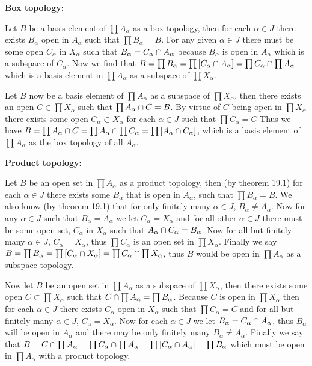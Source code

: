 \documentclass{article}
\begin{document}
\textbf{Box topology:}

Let $B$ be a basis element of $\prod A_\alpha$ as a box topology, then for each $\alpha \in J$ there exists $B_\alpha$ open in $A_\alpha$ such that $\prod B_\alpha = B$. For any given $\alpha\in J$ there must be some open $C_\alpha$ in $X_\alpha$ such that $B_\alpha = C_\alpha \cap A_\alpha$ because $B_\alpha$ is open in $A_\alpha$ which is a subspace of $C_\alpha$. Now we find that $B = \prod B_\alpha = \prod\left[C_\alpha \cap A_\alpha\right] = \prod C_\alpha \cap \prod A_\alpha$ which is a basis element in $\prod A_\alpha$ as a subspace of $\prod X_\alpha$.

Let $B$ now be a basis element of $\prod A_\alpha$ as a subspace of $\prod X_\alpha$, then there exists an open $C \in \prod X_\alpha$ such that $\prod A_\alpha \cap C = B$. By virtue of $C$ being open in $\prod X_\alpha$ there exists some open $C_\alpha \subset X_\alpha$ for each $\alpha \in J$ such that $\prod C_\alpha = C$ Thus we have $B = \prod A_\alpha \cap C = \prod A_\alpha \cap \prod C_\alpha = \prod\left[A_\alpha \cap C_\alpha\right]$, which is a basis element of $\prod A_\alpha$ as the box topology of all $A_\alpha$.

\textbf{Product topology:}

Let $B$ be an open set in $\prod A_\alpha$ as a product topology, then (by theorem 19.1) for each $\alpha \in J$ there exists some $B_\alpha$ that is open in $A_\alpha$, such that $\prod B_\alpha = B$. We also know (by theorem 19.1) that for only finitely many $\alpha \in J$, $B_\alpha \not= A_\alpha$. Now for any $\alpha \in J$ such that $B_\alpha = A_\alpha$ we let $C_\alpha = X_\alpha$ and for all other $\alpha \in J$ there must be some open set, $C_\alpha$ in $X_\alpha$ such that $A_\alpha \cap C_\alpha = B_\alpha$. Now for all but finitely many $\alpha \in J$, $C_\alpha = X_\alpha$, thus $\prod C_\alpha$ is an open set in $\prod X_\alpha$. Finally we say $B = \prod B_\alpha = \prod\left[C_\alpha \cap X_\alpha\right] = \prod C_\alpha \cap \prod X_\alpha$, thus $B$ would be open in $\prod A_\alpha$ as a subspace topology.

Now let $B$ be an open set in $\prod A_\alpha$ as a subspace of $\prod X_\alpha$, then there exists some open $C\subset\prod X_\alpha$ such that $C \cap \prod A_\alpha = \prod B_\alpha$. Because $C$ is open in $\prod X_\alpha$ then for each $\alpha\in J$ there exists $C_\alpha$ open in $X_\alpha$ such that $\prod C_\alpha = C$ and for all but finitely many $\alpha \in J$, $C_\alpha = X_\alpha$. Now for each $\alpha \in J$ we let $B_\alpha = C_\alpha \cap A_\alpha$, thus $B_\alpha$ will be open in $A_\alpha$ and there may be only finitely many $B_\alpha \not= A_\alpha$. Finally we say that $B = C\cap\prod A_\alpha = \prod C_\alpha \cap \prod A_\alpha = \prod\left[C_\alpha \cap A_\alpha\right] = \prod B_\alpha$ which must be open in $\prod A_\alpha$ with a product topology.
\end{document}
